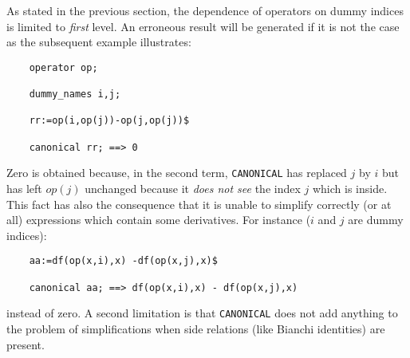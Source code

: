 As stated in the previous section, the dependence of operators on dummy 
indices is limited to {\em first} level. An erroneous result
will be generated if it is not the case as the subsequent example 
illustrates:
\begin{verbatim}
    operator op;

    dummy_names i,j;

    rr:=op(i,op(j))-op(j,op(j))$

    canonical rr; ==> 0
\end{verbatim}
Zero is obtained because, in the second term, {\tt CANONICAL} has replaced 
$j$ by $i$ but has left $op(j)$ unchanged because it {\em does not see}
the index $j$ which is inside. This fact has also the consequence that 
it is unable to simplify correctly (or at all) expressions which 
contain some derivatives.
For instance ($i$ and $j$ are dummy indices):
\begin{verbatim}
    aa:=df(op(x,i),x) -df(op(x,j),x)$

    canonical aa; ==> df(op(x,i),x) - df(op(x,j),x)
\end{verbatim} 
instead of zero.
A second limitation is that {\tt CANONICAL} does not add anything to the
 problem of simplifications when side relations (like Bianchi identities) 
 are present.
\iffalse
